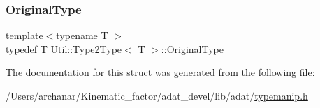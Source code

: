 \subsubsection{\texorpdfstring{OriginalType}{OriginalType}\hspace{0.1cm}{\footnotesize\ttfamily [2/2]}}
{\footnotesize\ttfamily template$<$typename T $>$ \\
typedef T \mbox{\hyperlink{structUtil_1_1Type2Type}{Util\+::\+Type2\+Type}}$<$ T $>$\+::\mbox{\hyperlink{structUtil_1_1Type2Type_a053c4160c945f1588beb737bb6e952d1}{Original\+Type}}}



The documentation for this struct was generated from the following file\+:\begin{DoxyCompactItemize}
\item 
/\+Users/archanar/\+Kinematic\+\_\+factor/adat\+\_\+devel/lib/adat/\mbox{\hyperlink{lib_2adat_2typemanip_8h}{typemanip.\+h}}\end{DoxyCompactItemize}
